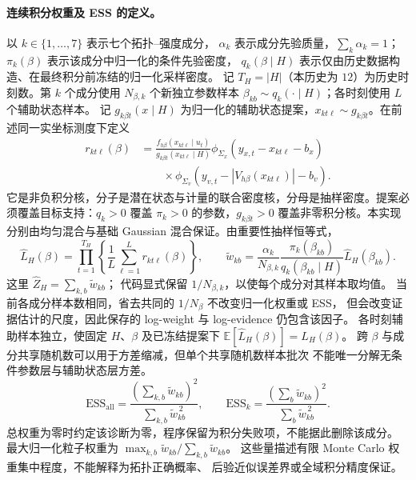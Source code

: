 \documentclass[UTF8,fontset=fandol,11pt,a4paper]{ctexart}
\begin{document}
\paragraph{连续积分权重及 ESS 的定义。}
以 $k\in\{1,\ldots,7\}$ 表示七个拓扑--强度成分，
$\alpha_k$ 表示成分先验质量，$\sum_k\alpha_k=1$；
$\pi_k(\beta)$ 表示该成分中归一化的条件先验密度，
$q_k(\beta\mid H)$ 表示仅由历史数据构造、在最终积分前冻结的归一化采样密度。
记 $T_H=|H|$（本历史为 $12$）为历史时刻数。第 $k$ 个成分使用 $N_{\beta,k}$ 个新独立参数样本
$\beta_{kb}\sim q_k(\cdot\mid H)$；各时刻使用 $L$ 个辅助状态样本。
记 $g_{k\beta t}(x\mid H)$ 为归一化的辅助状态提案，$x_{kt\ell}\sim g_{k\beta t}$。在前述同一实坐标测度下定义
\begin{equation}
 \begin{aligned}
 r_{kt\ell}(\beta)
 &=\frac{f_{h\beta}(x_{kt\ell}\mid u_t)}{g_{k\beta t}(x_{kt\ell}\mid H)}
   \phi_{\Sigma_x}(y_{x,t}-x_{kt\ell}-b_x)\\
 &\qquad\times\phi_{\Sigma_v}(y_{v,t}-|V_{h\beta}(x_{kt\ell})|-b_v).
 \end{aligned}
\end{equation}
它是非负积分核，分子是潜在状态与计量的联合密度核，分母是抽样密度。提案必须覆盖目标支持：$q_k>0$ 覆盖 $\pi_k>0$ 的参数，$g_{k\beta t}>0$ 覆盖非零积分核。本实现分别由均匀混合与基础 Gaussian 混合保证。由重要性抽样恒等式，
\begin{equation}
 \widehat L_H(\beta)=\prod_{t=1}^{T_H}
 \left\{\frac1L\sum_{\ell=1}^{L}r_{kt\ell}(\beta)\right\},
 \qquad
 \widetilde w_{kb}=
 \frac{\alpha_k}{N_{\beta,k}}
 \frac{\pi_k(\beta_{kb})}{q_k(\beta_{kb}\mid H)}
 \widehat L_H(\beta_{kb}).
\end{equation}
这里 $\widehat Z_H=\sum_{k,b}\widetilde w_{kb}$；
代码显式保留 $1/N_{\beta,k}$，以使每个成分对其样本取均值。
当前各成分样本数相同，省去共同的 $1/N_{\beta}$ 不改变归一化权重或 ESS，
但会改变证据估计的尺度，因此保存的 log-weight 与 log-evidence 仍包含该因子。
各时刻辅助样本独立，使固定 $H$、$\beta$ 及已冻结提案下
$\mathbb E[\widehat L_H(\beta)]=L_H(\beta)$。
跨 $\beta$ 与成分共享随机数可以用于方差缩减，但单个共享随机数样本批次
不能唯一分解无条件参数层与辅助状态层方差。
\begin{equation}
 \mathrm{ESS}_{\mathrm{all}}=
 \frac{(\sum_{k,b}\widetilde w_{kb})^2}{\sum_{k,b}\widetilde w_{kb}^{\,2}},
 \qquad
 \mathrm{ESS}_{k}=
 \frac{(\sum_b\widetilde w_{kb})^2}{\sum_b\widetilde w_{kb}^{\,2}}.
\end{equation}
总权重为零时约定该诊断为零，程序保留为积分失败项，不能据此删除该成分。
最大归一化粒子权重为
$\max_{k,b}\widetilde w_{kb}/\sum_{k,b}\widetilde w_{kb}$。
这些量描述有限 Monte Carlo 权重集中程度，不能解释为拓扑正确概率、
后验近似误差界或全域积分精度保证。
\end{document}
